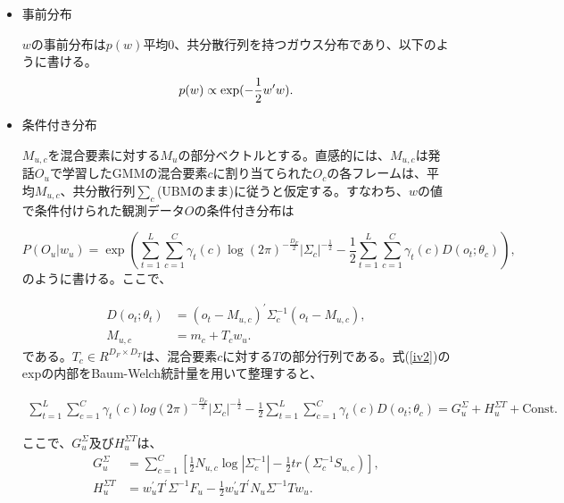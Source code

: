 \begin{itemize}
\item 事前分布\par
$w$の事前分布は$p(w)$平均0、共分散行列を持つガウス分布であり、以下のように書ける。
\begin{equation}
p(w)\propto \exp(-\frac{1}{2}w^{\prime}w). \notag
\end{equation}

\item 条件付き分布\par
$M_{u,c}$を混合要素に対する$M_u$の部分ベクトルとする。直感的には、$M_{u,c}$は発話$O_u$で学習したGMMの混合要素$c$に割り当てられた$O_c$の各フレームは、平均$M_{u,c}$、共分散行列$\sum_{c}$(UBMのまま)に従うと仮定する。すなわち、$w$の値で条件付けられた観測データ$O$の条件付き分布は

\begin{equation}
\label{iv2}
P(O_u|w_u)=\exp\left(\sum_{t=1}^{L}\sum_{c=1}^{C}\gamma_t(c)\log(2\pi )^{-\frac{D_F}{2}}\left|\Sigma_{c}\right|^{-\frac{1}{2}}-\frac{1}{2}\sum_{t=1}^{L}\sum_{c=1}^{C}\gamma_t(c)D(o_t;\theta_c) \right),
\end{equation}
のように書ける。ここで、

\begin{align}
D(o_t;\theta_t) &=(o_t-M_{u,c})^\prime \Sigma_{c}^{-1}(o_t-M_{u,c}), \\
M_{u,c} &=m_c+T_cw_u.
\end{align}
である。$T_c\in R^{D_F\times D_T}$は、混合要素$c$に対する$T$の部分行列である。式(\ref{iv2})のexpの内部をBaum-Welch統計量を用いて整理すると、

\begin{equation}
\begin{split}
\sum_{t=1}^{L}\sum_{c=1}^{C}\gamma_t(c)log(2\pi )^{-\frac{D_F}{2}}\left|\Sigma_{c}\right|^{-\frac{1}{2}}-\frac{1}{2}\sum_{t=1}^{L}\sum_{c=1}^{C}\gamma_t(c)D(o_t;\theta_c)=G_u^\Sigma+H_u^{\Sigma T}+\text{Const.}
\end{split}
\end{equation}

ここで、$G_u^\Sigma$及び$H_u^{\Sigma T}$は、
\begin{align}
G_u^\Sigma &=\sum_{c=1}^C\left[\frac{1}{2}N_{u,c}\log\left|\Sigma_c^{-1}\right|-\frac{1}{2}tr\left(\Sigma_c^{-1}S_{u,c}\right)\right], \\
H_u^{\Sigma T} &=w_u^\prime T^\prime \Sigma^{-1}F_u-\frac{1}{2}w_u^\prime T^\prime N_u\Sigma^{-1}Tw_u. \label{iv3}
\end{align}


\end{itemize}
